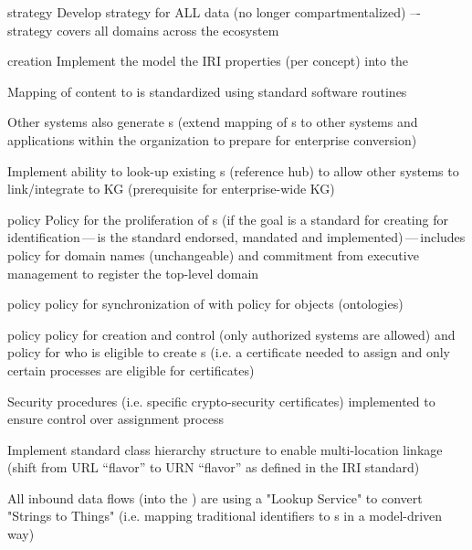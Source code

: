 \begin{scoring}

  \item [strategy] Develop strategy for ALL data (no longer compartmentalized) –- strategy covers all domains across
        the ecosystem
  \item [creation] Implement the model the IRI properties (per concept) into the 
  \item Mapping of content to  is standardized using standard software routines
  \item Other systems also generate s (extend mapping of s to other systems and
        applications within the organization to prepare for enterprise conversion)
  \item Implement ability to look-up existing s (reference hub) to allow other systems to
        link/integrate to KG (prerequisite for enterprise-wide KG)
  \item [policy] Policy for the proliferation of s (if the goal is a standard for creating for
        identification\,---\,is the standard endorsed, mandated and implemented)\,---\,includes policy
        for domain names (unchangeable) and commitment from executive management to register the top-level domain
  \item [policy] policy for synchronization of  with policy for objects (ontologies)
  \item [policy] policy for creation and control (only authorized systems are allowed) and policy for who is
        eligible to create s (i.e. a certificate needed to assign and only certain processes are
        eligible for certificates)

\end{scoring}

\ekgmmscoringlevelThree

\begin{scoring}

  \item Security procedures (i.e. specific crypto-security certificates) implemented to ensure control over
         assignment process
  \item Implement standard  class hierarchy structure to enable multi-location linkage (shift from
        URL “flavor” to URN “flavor” as defined in the IRI standard)
  \item All inbound data flows (into the ) are using a "Lookup Service" to convert "Strings to Things"
        (i.e. mapping traditional identifiers to s in a model-driven way)

\end{scoring}
